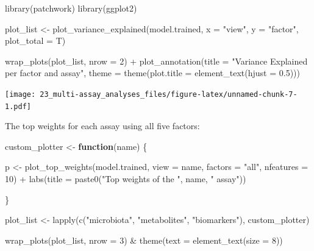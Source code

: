 \documentclass[
]{book}
\newenvironment{Shaded}{\begin{snugshade}}{\end{snugshade}}
\newcommand{\AttributeTok}[1]{\textcolor[rgb]{0.77,0.63,0.00}{#1}}
\newcommand{\ControlFlowTok}[1]{\textcolor[rgb]{0.13,0.29,0.53}{\textbf{#1}}}
\newcommand{\DecValTok}[1]{\textcolor[rgb]{0.00,0.00,0.81}{#1}}
\newcommand{\FloatTok}[1]{\textcolor[rgb]{0.00,0.00,0.81}{#1}}
\newcommand{\FunctionTok}[1]{\textcolor[rgb]{0.00,0.00,0.00}{#1}}
\newcommand{\NormalTok}[1]{#1}
\newcommand{\OtherTok}[1]{\textcolor[rgb]{0.56,0.35,0.01}{#1}}
\newcommand{\SpecialCharTok}[1]{\textcolor[rgb]{0.00,0.00,0.00}{#1}}
\newcommand{\StringTok}[1]{\textcolor[rgb]{0.31,0.60,0.02}{#1}}
\begin{document}
\begin{Shaded}
\begin{Highlighting}[]
\FunctionTok{library}\NormalTok{(patchwork)}
\FunctionTok{library}\NormalTok{(ggplot2)}

\NormalTok{plot\_list }\OtherTok{\textless{}{-}} \FunctionTok{plot\_variance\_explained}\NormalTok{(model.trained,}
                                     \AttributeTok{x =} \StringTok{"view"}\NormalTok{, }\AttributeTok{y =} \StringTok{"factor"}\NormalTok{,}
                                     \AttributeTok{plot\_total =}\NormalTok{ T)}

\FunctionTok{wrap\_plots}\NormalTok{(plot\_list, }\AttributeTok{nrow =} \DecValTok{2}\NormalTok{) }\SpecialCharTok{+}
  \FunctionTok{plot\_annotation}\NormalTok{(}\AttributeTok{title =} \StringTok{"Variance Explained per factor and assay"}\NormalTok{,}
                  \AttributeTok{theme =} \FunctionTok{theme}\NormalTok{(}\AttributeTok{plot.title =} \FunctionTok{element\_text}\NormalTok{(}\AttributeTok{hjust =} \FloatTok{0.5}\NormalTok{)))}
\end{Highlighting}
\end{Shaded}

\texttt{[image: 23\_multi-assay\_analyses\_files/figure-latex/unnamed-chunk-7-1.pdf]}

The top weights for each assay using all five factors:

\begin{Shaded}
\begin{Highlighting}[]
\NormalTok{custom\_plotter }\OtherTok{\textless{}{-}} \ControlFlowTok{function}\NormalTok{(name) \{}
  
\NormalTok{  p }\OtherTok{\textless{}{-}} \FunctionTok{plot\_top\_weights}\NormalTok{(model.trained,}
                        \AttributeTok{view =}\NormalTok{ name,}
                        \AttributeTok{factors =} \StringTok{"all"}\NormalTok{,}
                        \AttributeTok{nfeatures =} \DecValTok{10}\NormalTok{) }\SpecialCharTok{+}
    \FunctionTok{labs}\NormalTok{(}\AttributeTok{title =} \FunctionTok{paste0}\NormalTok{(}\StringTok{"Top weights of the "}\NormalTok{, name, }\StringTok{" assay"}\NormalTok{))}
  
\NormalTok{\}}

\NormalTok{plot\_list }\OtherTok{\textless{}{-}} \FunctionTok{lapply}\NormalTok{(}\FunctionTok{c}\NormalTok{(}\StringTok{"microbiota"}\NormalTok{, }\StringTok{"metabolites"}\NormalTok{, }\StringTok{"biomarkers"}\NormalTok{), custom\_plotter)}

\FunctionTok{wrap\_plots}\NormalTok{(plot\_list, }\AttributeTok{nrow =} \DecValTok{3}\NormalTok{) }\SpecialCharTok{\&} \FunctionTok{theme}\NormalTok{(}\AttributeTok{text =} \FunctionTok{element\_text}\NormalTok{(}\AttributeTok{size =} \DecValTok{8}\NormalTok{))}
\end{Highlighting}
\end{Shaded}
\end{document}
